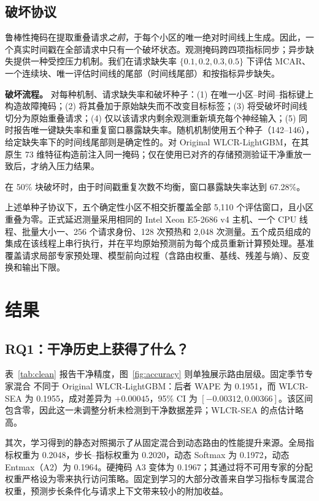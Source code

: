 \documentclass[10pt,conference,letterpaper]{IEEEtran}
\newcommand{\method}{WLCR-SEA}
\newcommand{\originalmethod}{Original WLCR-LightGBM}
\newcommand{\fixedmixture}{固定季节专家混合}
\begin{document}
\subsection{破坏协议}
鲁棒性掩码在提取重叠请求\emph{之前}，于每个小区的唯一绝对时间线上生成。因此，一个真实时间戳在全部请求中只有一个破坏状态。观测掩码跨四项指标同步；异步缺失提供一种受控压力机制。我们在请求缺失率 $\{0.1,0.2,0.3,0.5\}$ 下评估 MCAR、一个连续块、唯一评估时间线的尾部（时间线尾部）和按指标异步缺失。

\noindent\textbf{破坏流程。} 对每种机制、请求缺失率和破坏种子：(1) 在唯一小区--时间--指标键上构造故障掩码；(2) 将其叠加于原始缺失而不改变目标标签；(3) 将受破坏时间线切分为原始重叠请求；(4) 仅以该请求内剩余观测重新填充每个神经输入；(5) 同时报告唯一键缺失率和重复窗口暴露缺失率。随机机制使用五个种子（142--146），给定缺失率下的时间线尾部则是确定性的。对 \originalmethod{}，在其原生 73 维特征构造前注入同一掩码；仅在使用已对齐的存储预测验证干净重放一致后，才纳入压力结果。

在 50\% 块破坏时，由于时间戳重复次数不均衡，窗口暴露缺失率达到 67.28\%。

上述单种子协议下，五个确定性小区不相交折覆盖全部 5,110 个评估窗口，且小区重叠为零。正式延迟测量采用相同的 Intel Xeon E5-2686 v4 主机、一个 CPU 线程、批量大小一、256 个请求身份、128 次预热和 2,048 次测量。五个成员组成的集成在该线程上串行执行，并在平均原始预测前为每个成员重新计算预处理。基准覆盖请求局部专家预处理、模型前向过程（含路由权重、基线、残差与熵）、反变换和输出下限。

\section{结果}
\subsection{RQ1：干净历史上获得了什么？}
表~\ref{tab:clean} 报告干净精度，图~\ref{fig:accuracy} 则单独展示路由层级。\fixedmixture{} 不同于 \originalmethod{}：后者 WAPE 为 0.1951，而 \method{} 为 0.1955，成对差异为 $+0.00045$，95\% CI 为 $[-0.00312,0.00366]$。该区间包含零，因此这一未调整分析未检测到干净数据差异；\method{} 的点估计略高。

其次，学习得到的静态对照揭示了从固定混合到动态路由的性能提升来源。全局指标权重为 0.2048，步长--指标权重为 0.2020，动态 Softmax 为 0.1972，动态 Entmax（A2）为 0.1964。硬掩码 A3 变体为 0.1967；其通过将不可用专家的分配权重严格设为零来执行访问策略。固定到学习的大部分改善来自学习指标专属混合权重，预测步长条件化与请求上下文带来较小的附加收益。
\end{document}
